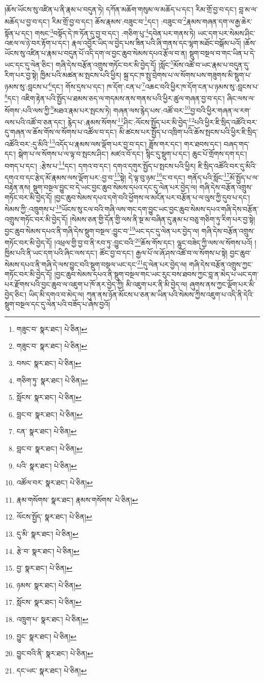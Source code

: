 །ཆོས་ཡོངས་སུ་འཛིན་པ་ནི་རྣམ་པ་བདུན་ཏེ། དཀོན་མཆོག་གསུམ་ལ་མཆོད་པ་དང་། རིམ་གྲོ་བྱ་བ་དང་། བླ་མ་ལ་མཆོད་པ་བྱ་བ་དང་། རིམ་གྲོ་བྱ་བ་དང་། ཆོས་རྣམས་:བཟུང་བ་\footnote{གཟུང་བ་  སྣར་ཐང་།  པེ་ཅིན། }དང་། :བཟུང་བ་\footnote{གཟུང་བ་  སྣར་ཐང་།  པེ་ཅིན། }རྣམས་གཞན་དག་ལ་རྒྱ་ཆེར་སྟོན་པ་དང་། གསང་\footnote{བསང་  སྣར་ཐང་།  པེ་ཅིན། }བསྟོད་དེ་ཁ་ཏོན་དུ་བྱ་བ་དང་། :གཅིག་པུ་\footnote{གཅིག་ཏུ་  སྣར་ཐང་།  པེ་ཅིན། }དབེན་པར་གནས་ཏེ། ཡང་དག་པར་སེམས་ཤིང་འཇལ་ལ་ཉེ་བར་རྟོག་པ་དང་། རྣལ་འབྱོར་ཡིད་ལ་བྱེད་པས་ཟིན་པའི་ཞི་གནས་དང་ལྷག་མཐོང་བསྒོམ་པའོ། །ཆོས་ཡོངས་སུ་འཛིན་པ་རྣམ་པ་བདུན་པོ་འདི་དག་ལ་བྱང་ཆུབ་སེམས་དཔའ་རྩོལ་བ་ན། སྡུག་བསྔལ་བ་གང་ཡིན་པ་དེ་ཡང་དང་དུ་ལེན་ཅིང་། གཞི་དེས་བརྩོན་འགྲུས་གཏོང་བར་མི་བྱེད་དོ། །སློང་\footnote{སློངས་  སྣར་ཐང་།  པེ་ཅིན། }མོས་འཚོ་བ་ཡང་རྣམ་པ་བདུན་དུ་རིག་པར་བྱ་སྟེ། ཁྱིམ་པའི་མཚན་མ་སྤངས་པའི་ཕྱིར། སྐྲ་དང་ཁ་སྤུ་བྲེགས་པ་ལ་སོགས་པས་གཟུགས་མི་སྡུག་པ་ཉམས་སུ་:བླངས་པ་\footnote{བླང་བ་  སྣར་ཐང་།  པེ་ཅིན། }དང་། གོས་དྲས་པ་དང་། ཁ་དོག་:ངན་པ་\footnote{ངན་  སྣར་ཐང་།  པེ་ཅིན། }འཆང་བའི་ཕྱིར་ཁ་དོག་ངན་པ་ཉམས་སུ་:བླངས་པ་\footnote{བླང་བ་  སྣར་ཐང་།  པེ་ཅིན། }དང་། འཇིག་རྟེན་པའི་སྤྱོད་པ་ཐམས་ཅད་ལ་གདམས་ནས་གནས་པའི་ཕྱིར་ཚུལ་གཞན་བྱ་བ་དང་། ཞིང་ལས་ལ་སོགས་:པའི་ལས་ཀྱི་\footnote{པའི་  སྣར་ཐང་།  པེ་ཅིན། }མཐའ་རྣམ་པར་སྤངས་ཏེ། གཞན་ལས་རྙེད་པས་:འཚོ་བར་\footnote{འཚོལ་བར་  སྣར་ཐང་།  པེ་ཅིན། }བྱ་བའི་ཕྱིར་གཞན་ལ་རག་ལས་པའི་འཚོ་བ་ཅན་དང་། རྙེད་པ་:རྣམས་སོགས་\footnote{རྣམ་གསོགས་  སྣར་ཐང་། རྣམས་གསོགས་  པེ་ཅིན། }ཤིང་:ལོངས་སྤྱོད་པར་མི་བྱེད་\footnote{ལོངས་སྤྱོད་  སྣར་ཐང་།  པེ་ཅིན། }པའི་ཕྱིར་ཇི་སྲིད་འཚོའི་བར་དུ་གཞན་ལ་ཆོས་གོས་ལ་སོགས་པ་འཚོལ་བ་དང་། མི་ཚངས་པར་སྤྱོད་པ་འཁྲིག་པའི་ཆོས་སྤངས་པའི་ཕྱིར་ཇི་སྲིད་འཚོའི་བར་:དུ་མིའི་\footnote{དུ་མི་  སྣར་ཐང་།  པེ་ཅིན། }འདོད་པ་རྣམས་ལས་ལྡོག་པར་བྱ་བ་དང་། ཟློས་གར་དང་། གར་ཐབས་དང་། བཞད་གད་དང་། སྒེག་པ་ལ་སོགས་པ་ལ་ལྟ་བ་སྤངས་ཤིང་། མཛའ་བོ་དང་། སྙིང་དུ་སྡུག་པ་དང་། ཆུང་པོ་གྲོགས་དག་དང་། བགད་པ་དང་། :རྩེས་པ་\footnote{རྩེ་བ་  སྣར་ཐང་།  པེ་ཅིན། }དང་། དགའ་བ་དང་། དགའ་དགུར་སྤྱོད་པ་སྤངས་པའི་ཕྱིར། ཇི་སྲིད་འཚོའི་བར་དུ་མིའི་དགའ་བ་དང་རྩེད་མོ་རྣམས་ལས་ལྡོག་པར་:བྱ་བ་\footnote{བྱ་  སྣར་ཐང་།  པེ་ཅིན། }སྟེ། དེ་ལྟ་བུ་ཉམ་\footnote{ཉམས་  སྣར་ཐང་།  པེ་ཅིན། }ང་བ་དང་། གནོད་པའི་སློང་\footnote{སློངས་  སྣར་ཐང་།  པེ་ཅིན། }མོ་སྤྱོད་པ་ལ་བརྟེན་ནས། སྡུག་བསྔལ་བྱུང་བ་དེ་ཡང་བྱང་ཆུབ་སེམས་དཔའ་དང་དུ་ལེན་པར་བྱེད་ལ། གཞི་དེས་བརྩོན་འགྲུས་གཏོང་བར་མི་བྱེད་དོ། །བྱང་ཆུབ་སེམས་དཔའ་དགེ་བའི་ཕྱོགས་ལ་མངོན་པར་བརྩོན་པ་ལ་ལུས་ཀྱི་དུབ་པ་དང་། སེམས་ཀྱི་:འཁྲུགས་པ་\footnote{འཁྲུག་པ་  སྣར་ཐང་།  པེ་ཅིན། }ཡོངས་སུ་ངལ་བའི་གཞི་ལས་གང་དག་བྱུང་ཡང་བྱང་ཆུབ་སེམས་དཔའ་གཞི་དེས་བརྩོན་འགྲུས་གཏོང་བར་མི་བྱེད་དོ། །སེམས་ཅན་གྱི་དོན་གྱི་ལས་ནི་སྔ་མ་བཞིན་དུ་རྣམ་པ་བཅུ་གཅིག་ཏུ་རིག་པར་བྱ་སྟེ། བྱང་ཆུབ་སེམས་དཔའ་ནི་གཞི་དེས་སྡུག་བསྔལ་:བྱུང་བ་\footnote{བྱུང་  སྣར་ཐང་།  པེ་ཅིན། }ཡང་དང་དུ་ལེན་པར་བྱེད་ལ། གཞི་དེས་བརྩོན་འགྲུས་གཏོང་བར་མི་བྱེད་དོ། །འཕྲལ་གྱི་བྱ་བ་ནི་རབ་ཏུ་:བྱུང་བའི་\footnote{བྱུང་བའི་ནི་  སྣར་ཐང་།  པེ་ཅིན། }ཆོས་གོས་དང་། ལྷུང་བཟེད་ཀྱི་ལས་ལ་སོགས་པའོ། །ཁྱིམ་པའི་ནི་ཡང་དག་པའི་ཞིང་ལས་དང་། ཚོང་བྱ་བ་དང་། རྒྱལ་པོ་ལ་ཞོ་ཤས་འཚོ་བ་ལ་སོགས་པ་སྟེ། བྱང་ཆུབ་སེམས་དཔའ་ནི་གཞི་དེ་ལས་བྱུང་བའི་སྡུག་བསྔལ་ཡང་དང་\footnote{དང་ཡང་  སྣར་ཐང་།  པེ་ཅིན། }དུ་ལེན་པར་བྱེད་ལ། གཞི་དེས་བརྩོན་འགྲུས་ཀྱང་གཏོང་བར་མི་བྱེད་དོ། །བྱང་ཆུབ་སེམས་དཔའ་ནི་སྡུག་བསྔལ་གང་ཡང་རུང་བས་ཐབས་ཀྱང་བླ་ན་མེད་པ་ཡང་དག་པར་རྫོགས་པའི་བྱང་ཆུབ་ལ་འཇུག་པ་ཁོ་ནར་བྱེད་ཀྱི། མི་འཇུག་པར་ནི་མི་བྱེད་ལ། ཞུགས་ནས་ཀྱང་ལྡོག་པར་མི་བྱེད་ཅིང་། ཡིད་མི་དགའ་བ་མེད་ལ། ཀུན་ནས་ཉོན་མོངས་པ་ཅན་མ་ཡིན་པའི་སེམས་ཀྱིས་འཇུག་པ་འདི་ནི་དེའི་སྡུག་བསྔལ་དང་དུ་ལེན་པའི་བཟོད་པ་ཞེས་བྱའོ། 